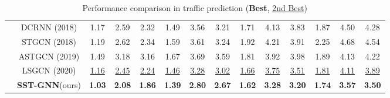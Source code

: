 \documentclass[runningheads]{llncs}
\begin{document}
\begin{table*}[!b]
{\begin{tabular}{c|c|ccc|ccc|ccc|ccc}
                          & DCRNN (2018)                  & {1.17}          & 2.59          & 2.32          & 1.49          & 3.56          & 3.21          & 1.71          & 4.13          & 3.83          & 1.87          & 4.50          & 4.28          \\ 
                          & STGCN (2018)                  & 1.19          & 2.62          & 2.34          & 1.59          & 3.61          & 3.24          & 1.92          & 4.21          & 3.91          & 2.25          & 4.68          & 4.54          \\  
                          & ASTGCN (2019)                & 1.49          & 3.18          & 3.16          & 1.67          & 3.69          & 3.59          & 1.81          & 3.92          & 3.98          & 1.89          & 4.13          & 4.22          \\ 
                          & LSGCN (2020)                  & \underline{1.16}          & \underline{2.45}          & \underline{2.24}          & \underline{1.46}          & 
                          \underline{3.28}          & 
                          \underline{3.02}          & 
                          \underline{1.66}          & \underline{3.75}          & \underline{3.51}          & 
                          \underline{1.81}          & 
                          \underline{4.11}          & 
                          \underline{3.89}          \\  
                          
                       
                           & \textbf{SST-GNN}(ours) &
                           \textbf{1.03} &
                           \textbf{2.08} &
                           \textbf{1.86} &
                           \textbf{1.39} &
                    \textbf{2.80} & \textbf{2.67} &
                    \textbf{1.62} &
                    \textbf{3.28} &
                    \textbf{3.20} &
                    \textbf{1.74} &
                    \textbf{3.57} &
                    \textbf{3.50} \\ \hline
\end{tabular}
}
\caption{Performance comparison in traffic prediction (\textbf{Best}, \underline{2nd Best})}
\label{tab:performance_comparison}
\end{table*}
\end{document}
